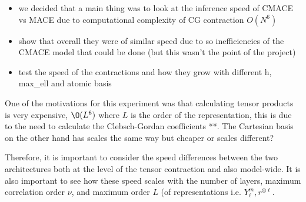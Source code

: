 \begin{itemize}
    \item we decided that a main thing was to look at the inference speed of CMACE vs MACE due to computational complexity of CG contraction $O(N^6)$
    \item show that overall they were of similar speed due to so inefficiencies of the CMACE model that could be done (but this wasn't the point of the project)
    \item test the speed of the contractions and how they grow with different h, max\_ell and atomic basis 
\end{itemize}

One of the motivations for this experiment was that calculating tensor products is very expensive, $\O(L^6)$ where $L$ is the order of the representation, this is due to the need to calculate the Clebsch-Gordan coefficients **. The Cartesian basis on the other hand has scales the same way but cheaper or scales different? 

Therefore, it is important to consider the speed differences between the two architectures both at the level of the tensor contraction and also model-wide. It is also important to see how these speed scales with the number of layers, maximum correlation order $\nu$, and maximum order $L$ (of representations i.e. $Y^m_\ell, r^{\otimes \ell}$. 


